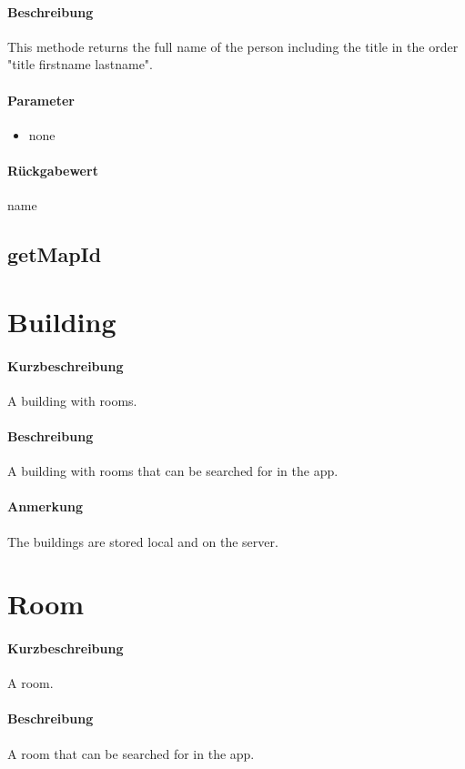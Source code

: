 \paragraph*{Beschreibung}
This methode returns the full name of the person including the title in the order "title firstname lastname".
\paragraph*{Parameter}
\begin{itemize}
    \item none
\end{itemize}
\paragraph*{Rückgabewert}
name

\subsection{getMapId}


\section{Building}
\paragraph*{Kurzbeschreibung}
A building with rooms.
\paragraph*{Beschreibung}
A building with rooms that can be searched for in the app.
\paragraph*{Anmerkung}
The buildings are stored local and on the server.


\section{Room}
\paragraph*{Kurzbeschreibung}
A room.
\paragraph*{Beschreibung}
A room that can be searched for in the app.
